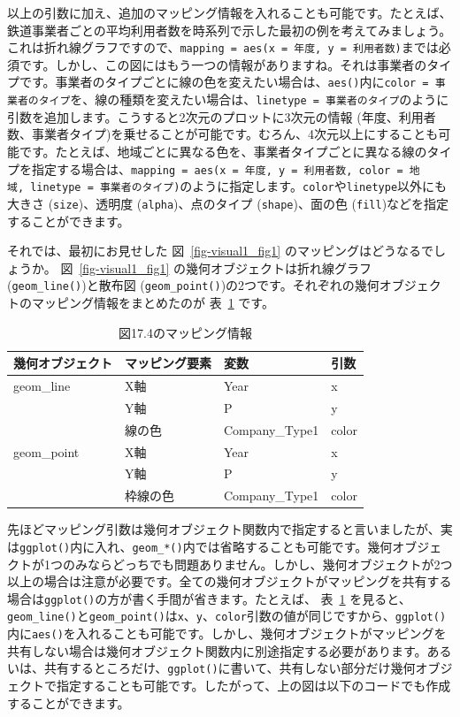 \documentclass[
  a4paper,
  pandoc,
  ja=standard,
  jafont=haranoaji]{bxjsbook}
\begin{document}
以上の引数に加え、追加のマッピング情報を入れることも可能です。たとえば、鉄道事業者ごとの平均利用者数を時系列で示した最初の例を考えてみましょう。これは折れ線グラフですので、\texttt{mapping\ =\ aes(x\ =\ 年度,\ y\ =\ 利用者数)}までは必須です。しかし、この図にはもう一つの情報がありますね。それは事業者のタイプです。事業者のタイプごとに線の色を変えたい場合は、\texttt{aes()}内に\texttt{color\ =\ 事業者のタイプ}を、線の種類を変えたい場合は、\texttt{linetype\ =\ 事業者のタイプ}のように引数を追加します。こうすると2次元のプロットに3次元の情報
(年度、利用者数、事業者タイプ)を乗せることが可能です。むろん、4次元以上にすることも可能です。たとえば、地域ごとに異なる色を、事業者タイプごとに異なる線のタイプを指定する場合は、\texttt{mapping\ =\ aes(x\ =\ 年度,\ y\ =\ 利用者数,\ color\ =\ 地域,\ linetype\ =\ 事業者のタイプ)}のように指定します。\texttt{color}や\texttt{linetype}以外にも大きさ
(\texttt{size})、透明度 (\texttt{alpha})、点のタイプ
(\texttt{shape})、面の色 (\texttt{fill})などを指定することができます。

それでは、最初にお見せした 図~\ref{fig-visual1_fig1}
のマッピングはどうなるでしょうか。 図~\ref{fig-visual1_fig1}
の幾何オブジェクトは折れ線グラフ (\texttt{geom\_line()})と散布図
(\texttt{geom\_point()})の2つです。それぞれの幾何オブジェクトのマッピング情報をまとめたのが
表~\ref{tbl-visual1_mapping1} です。

\hypertarget{tbl-visual1_mapping1}{}
\begin{table}
\caption{\label{tbl-visual1_mapping1}図17.4のマッピング情報 }

\centering
\begin{tabular}{l|l|l|l}
\hline
幾何オブジェクト & マッピング要素 & 変数 & 引数\\
\hline
geom\_line & X軸 & Year & x\\
\hline
 & Y軸 & P & y\\
\hline
 & 線の色 & Company\_Type1 & color\\
\hline
geom\_point & X軸 & Year & x\\
\hline
 & Y軸 & P & y\\
\hline
 & 枠線の色 & Company\_Type1 & color\\
\hline
\end{tabular}
\end{table}

先ほどマッピング引数は幾何オブジェクト関数内で指定すると言いましたが、実は\texttt{ggplot()}内に入れ、\texttt{geom\_*()}内では省略することも可能です。幾何オブジェクトが1つのみならどっちでも問題ありません。しかし、幾何オブジェクトが2つ以上の場合は注意が必要です。全ての幾何オブジェクトがマッピングを共有する場合は\texttt{ggplot()}の方が書く手間が省きます。たとえば、
表~\ref{tbl-visual1_mapping1}
を見ると、\texttt{geom\_line()}と\texttt{geom\_point()}は\texttt{x}、\texttt{y}、\texttt{color}引数の値が同じですから、\texttt{ggplot()}内に\texttt{aes()}を入れることも可能です。しかし、幾何オブジェクトがマッピングを共有しない場合は幾何オブジェクト関数内に別途指定する必要があります。あるいは、共有するところだけ、\texttt{ggplot()}に書いて、共有しない部分だけ幾何オブジェクトで指定することも可能です。したがって、上の図は以下のコードでも作成することができます。
\end{document}
